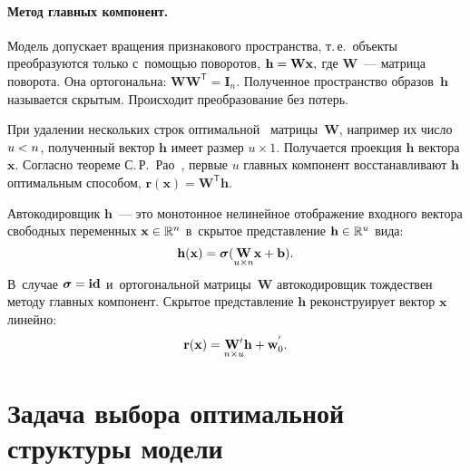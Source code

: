 \begin{multicols}{2}
\paragraph*{Метод главных компонент.} Модель допускает вращения признакового 
пространства, т.\,е.\ объекты преобразуются только с~помощью поворотов, 
$\mathbf{h} = \mathbf{W}{\mathbf{x}},$ где $\mathbf{W}$~--- матрица поворота. Она 
ортогональна:
$\mathbf{W}\mathbf{W}^\mathsf{T} = \mathbf{I}_n.$
Полученное пространство образов~$\mathbf{h}$ называется скрытым. Происходит 
преобразование без потерь.

При удалении нескольких строк оптимальной~\cite{fourth} матрицы~$\mathbf{W}$, 
например их число $u \hm< n$,  полученный вектор $\mathbf{h}$ имеет размер $u 
\times 1$. Получается проекция $\mathbf{h}$ вектора $\mathbf{x}$. Согласно 
теореме С.\,Р.~Рао~\cite{fourth}, первые $u$ главных компонент 
восстанавливают $\mathbf{h}$ оптимальным способом, $\mathbf{r}(\mathbf{x}) = 
\mathbf{W}^{\mathsf{T}}\mathbf{h}.$

Автокодировщик $\mathbf{h}$~--- это монотонное нелинейное отображение 
входного вектора свободных переменных $\mathbf{x} \hm\in \mathbb{R}^n$ 
в~скрытое представление $\mathbf{h} \hm\in \mathbb{R}^{u}$ вида:
\begin{equation*}
\mathbf{h}({\mathbf{x}}) = {\boldsymbol{\sigma}}(\underset{u \times n}{\mathbf{W}}{\mathbf{x}} + \mathbf{b}) .
\end{equation*}
В~случае ${\boldsymbol{\sigma}} = \mathbf{id}$ и~ортогональной матрицы~$\mathbf{W}$
автокодировщик тождествен методу главных компонент. Скрытое представление 
$\mathbf{h}$ реконструирует вектор $\mathbf{x}$ линейно:
\begin{equation*}
\mathbf{r}({\mathbf{x}}) = \underset{n \times u}{\mathbf{W}{'}}\mathbf{h} + 
{\mathbf{w}}_{0}^{'}.
\end{equation*}

\section{Задача выбора оптимальной структуры модели}


\end{multicols}
